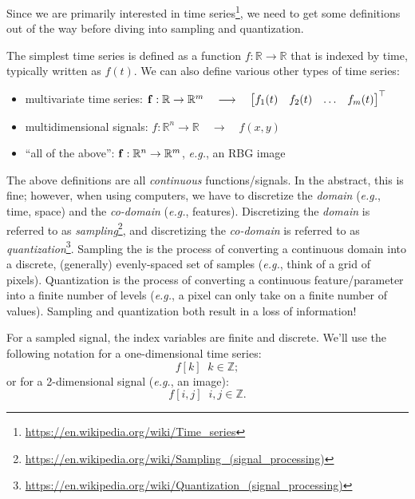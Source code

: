 \documentclass[11pt]{article}
\newcommand{\eg}{\emph{e.g.}}
\renewcommand{\vec}[1]{\ensuremath\mathbf{#1}}
\begin{document}
Since we are primarily interested in time series\footnote{\href{https://en.wikipedia.org/wiki/Time_series}{https://en.wikipedia.org/wiki/Time\_series}}, we need to get some definitions out of the way before diving into sampling and quantization.

The simplest time series is defined as a function $f: \mathbb{R} \rightarrow \mathbb{R}$ that is indexed by time, typically written as $f(t)$. We can also define various other types of time series:
\begin{itemize}
    \item multivariate time series: $\vec{f}: \mathbb{R} \rightarrow \mathbb{R}^m \quad \longrightarrow \quad \begin{bmatrix}f_1(t) & f_2(t) & \hdots & f_m(t)\end{bmatrix}^\top$
    \item multidimensional signals: $f: \mathbb{R}^n \rightarrow \mathbb{R} \quad \longrightarrow \quad f(x,y)$
    \item ``all of the above'': $\vec{f} : \mathbb{R}^n \rightarrow \mathbb{R}^m$, \eg, an RBG image
\end{itemize}

The above definitions are all \emph{continuous} functions/signals. In the abstract, this is fine; however, when using computers, we have to discretize the \emph{domain} (\eg, time, space) and the \emph{co-domain} (\eg, features). Discretizing the \emph{domain} is referred to as \emph{sampling}\footnote{\href{https://en.wikipedia.org/wiki/Sampling_(signal_processing)}{https://en.wikipedia.org/wiki/Sampling\_(signal\_processing)}}, and discretizing the \emph{co-domain} is referred to as \emph{quantization}\footnote{\href{https://en.wikipedia.org/wiki/Quantization_(signal_processing)}{https://en.wikipedia.org/wiki/Quantization\_(signal\_processing)}}. Sampling the is the process of converting a continuous domain into a discrete, (generally) evenly-spaced set of samples (\eg, think of a grid of pixels). Quantization is the process of converting a continuous feature/parameter into a finite number of levels (\eg, a pixel can only take on a finite number of values). Sampling and quantization both result in a loss of information!

For a sampled signal, the index variables are finite and discrete. We'll use the following notation for a one-dimensional time series:
\begin{equation}
    f[k] \;\; k \in \mathbb{Z};
    \label{eq:discrete notation 1d}
\end{equation}
or for a 2-dimensional signal (\eg, an image):
\begin{equation}
    f[i,j] \;\; i,j \in \mathbb{Z}.
    \label{eq:discrete notation 2d}
\end{equation}
\end{document}
